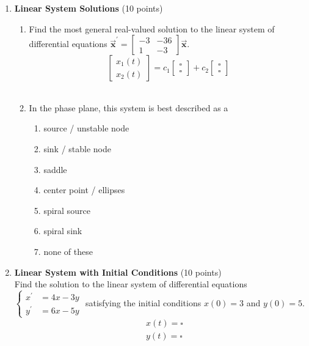 \begin{enumerate}
  \item \textbf{Linear System Solutions} (10 points)\\
  \begin{enumerate}[label=\alph*.]
    \item Find the most general real-valued solution to the linear system of differential equations $\overrightarrow{\boldsymbol{x}}^{\prime}=\left[\begin{array}{rr}-3 & -36 \\ 1 & -3\end{array}\right] \overrightarrow{\boldsymbol{x}}$.\\
    $$
    \left[\begin{array}{l}
    x_1(t) \\
    x_2(t)
    \end{array}\right]=c_1\left[\begin{array}{l}
    \square \\
    \square
    \end{array}\right]+c_2\left[\begin{array}{l}
    \square \\
    \square
    \end{array}\right]
    $$\\
    \begin{subanswer}
    \end{subanswer}
    \item In the phase plane, this system is best described as a
    \begin{enumerate}
      \item source / unstable node
      \item sink / stable node
      \item saddle
      \item center point / ellipses
      \item spiral source
      \item spiral sink
      \item none of these
    \end{enumerate}
    \begin{subanswer}
    \end{subanswer}
  \end{enumerate}

  \item \textbf{Linear System with Initial Conditions} (10 points)\\
  Find the solution to the linear system of differential equations $\left\{\begin{array}{ll}
  x^{\prime} & =4 x-3 y \\
  y^{\prime} & =6 x-5 y
  \end{array}\right.$ satisfying the initial conditions $x(0)=3$ and $y(0)=5$.
  $$
  \begin{aligned}
  & x(t)=\square \\
  & y(t)=\square
  \end{aligned}
  $$
  \begin{subanswer}
  \end{subanswer}

\end{enumerate}
